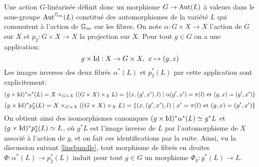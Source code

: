 Une action $G$-linéarisée définit donc un morphisme $G\rightarrow \operatorname{Aut}(L)$ à valeurs dans le sous-groupe $\operatorname{Aut}^{\mathbb{G}_m}(L)$ constitué des automorphismes de la variété $L$ qui commutent à l'action de $\mathbb{G}_m$ sur les fibres. On note $\alpha: G\times X\rightarrow X$ l'action de $G$ sur $X$ et $p_2:G\times X\rightarrow X$ la projection sur $X$. Pour tout $g\in G$ on a une application:
$$g\times \mathrm{Id}: X\rightarrow G\times X,\,\, x\mapsto (g,x)$$ 
Les images inverses des deux fibrés $\alpha^*(L)$ et $p_2^*(L)$ par cette application sont explicitement: 
$$(g\times \mathrm{Id})^*\alpha^*(L)=X\times_{G\times X}((G\times X)\times_X L)=\lbrace (x,(g',x'),l)\mid \alpha(g',x')=\pi(l)\text{ et } (g,x)=(g',x')\rbrace$$
$$(g\times \mathrm{Id})^*p_2^*(L)=X\times_{G\times X}((G\times X)\times_X L)=\lbrace (x,(g',x'),l)\mid x'=\pi(l)\text{ et } (g,x)=(g',x')\rbrace$$
On obtient ainsi des isomorphismes canoniques $(g\times \mathrm{Id})^*\alpha^*(L)\simeq g^*L$ et $(g\times \mathrm{Id})^*p_2^*(L)\simeq L$, où $g^*L$ est l'image inverse de $L$ par l'automorphisme de $X$ associé à l'action de $g$, et on fait ces identifications par la suite. Ainsi, vu la discussion suivant \ref{linebundle}, tout morphisme de fibrés en droites $\Phi: \alpha^*(L)\rightarrow p_2^*(L)$ induit pour tout $g\in G$ un morphisme $\Phi_g:g^*(L)\rightarrow L$.

